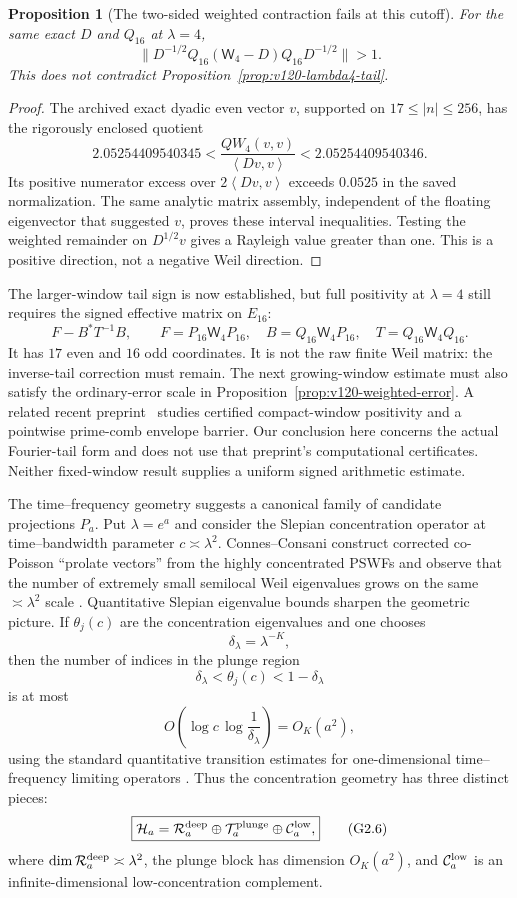 \documentclass[11pt]{article}
\newtheorem{proposition}[theorem]{Proposition}
\theoremstyle{remark}
\newcommand{\ip}[2]{\left\langle #1,#2\right\rangle}
\begin{document}
\begin{proposition}[The two-sided weighted contraction fails at this cutoff]
\label{prop:v120-norm-counterexample}
For the same exact $D$ and $Q_{16}$ at $\lambda=4$,
\[
 \|D^{-1/2}Q_{16}(\mathsf W_4-D)Q_{16}D^{-1/2}\|>1.
\]
This does not contradict Proposition~\ref{prop:v120-lambda4-tail}.
\end{proposition}
\begin{proof}
The archived exact dyadic even vector $v$, supported on
$17\le|n|\le256$, has the rigorously enclosed quotient
\[
 2.05254409540345<\frac{QW_4(v,v)}{\ip{Dv}{v}}
                         <2.05254409540346.
\]
Its positive numerator excess over $2\ip{Dv}{v}$ exceeds
$0.0525$ in the saved normalization. The same analytic matrix
assembly, independent of the floating eigenvector that suggested
$v$, proves these interval inequalities. Testing the weighted
remainder on $D^{1/2}v$ gives a Rayleigh value greater than one.
This is a positive direction, not a negative Weil direction.
\end{proof}

The larger-window tail sign is now established, but full positivity
at $\lambda=4$ still requires the signed effective matrix on
$E_{16}$:
\[
 F-B^*T^{-1}B,\qquad
 F=P_{16}\mathsf W_4P_{16},\quad B=Q_{16}\mathsf W_4P_{16},
 \quad T=Q_{16}\mathsf W_4Q_{16}.
\]
It has $17$ even and $16$ odd coordinates. It is not the raw finite
Weil matrix: the inverse-tail correction must remain.
The next growing-window estimate must also satisfy the ordinary-error
scale in Proposition~\ref{prop:v120-weighted-error}.
A related recent preprint~\cite{Zhu2026Windows} studies certified
compact-window positivity and a pointwise prime-comb envelope barrier.
Our conclusion here concerns the actual Fourier-tail form and does
not use that preprint's computational certificates. Neither fixed-window
result supplies a uniform signed arithmetic estimate.

The time--frequency geometry suggests a canonical family of candidate projections $P_a$.  Put $\lambda=e^a$ and consider the Slepian concentration operator at time--bandwidth parameter $c\asymp\lambda^2$.  Connes--Consani construct corrected co-Poisson ``prolate vectors'' from the highly concentrated PSWFs and observe that the number of extremely small semilocal Weil eigenvalues grows on the same $\asymp\lambda^2$ scale \cite{ConnesConsani2023}.  Quantitative Slepian eigenvalue bounds sharpen the geometric picture.  If $\theta_j(c)$ are the concentration eigenvalues and one chooses
\[
 \delta_\lambda=\lambda^{-K},
\]
then the number of indices in the plunge region
\[
 \delta_\lambda<\theta_j(c)<1-\delta_\lambda
\]
is at most
\[
 O\!\left(\log c\,\log\frac1{\delta_\lambda}\right)=O_K(a^2),
 \tag{G2.5}
\]
using the standard quantitative transition estimates for one-dimensional time--frequency limiting operators \cite{SlepianTransition}.  Thus the concentration geometry has three distinct pieces:
\[
 \boxed{
 \mathcal H_a
 =\mathcal R_a^{\rm deep}\oplus
   \mathcal T_a^{\rm plunge}\oplus
   \mathcal C_a^{\rm low},
 }
 \tag{G2.6}
\]
where $\dim\mathcal R_a^{\rm deep}\asymp\lambda^2$, the plunge block has dimension $O_K(a^2)$, and $\mathcal C_a^{\rm low}$ is an infinite-dimensional low-concentration complement.
\end{document}

